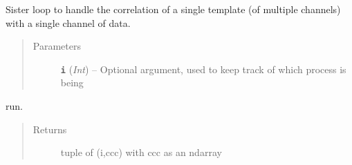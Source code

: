 \documentclass[a4paper,10pt,english]{sphinxmanual}
\begin{document}

\begin{fulllineitems}
\label{modules:match_filter._template_loop}
Sister loop to handle the correlation of a single template (of multiple
channels) with a single channel of data.
\begin{quote}\begin{description}
\item[{Parameters}] \leavevmode
\textbf{\texttt{i}} (\emph{Int}) -- Optional argument, used to keep track of which process is being

\end{description}\end{quote}

run.
\begin{quote}\begin{description}
\item[{Returns}] \leavevmode
tuple of (i,ccc) with ccc as an ndarray

\end{description}\end{quote}

\end{fulllineitems}

\end{document}
